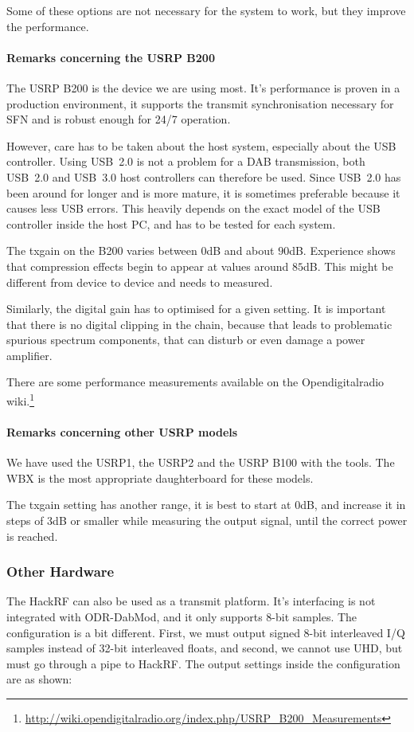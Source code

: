 Some of these options are not necessary for the system to work, but they
improve the performance.

\paragraph{Remarks concerning the USRP B200}
The USRP B200 is the device we are using most. It's performance is proven in a
production environment, it supports the transmit synchronisation necessary for
SFN and is robust enough for 24/7 operation.

However, care has to be taken about the host system, especially about the USB
controller. Using USB~2.0 is not a problem for a DAB transmission, both USB~2.0
and USB~3.0 host controllers can therefore be used. Since USB~2.0 has been
around for longer and is more mature, it is sometimes preferable because it
causes less USB errors. This heavily depends on the exact model of the USB
controller inside the host PC, and has to be tested for each system.

The txgain on the B200 varies between $0$dB and about $90$dB. Experience shows
that compression effects begin to appear at values around $85$dB. This might be
different from device to device and needs to measured.

Similarly, the digital gain has to optimised for a given setting. It is
important that there is no digital clipping in the chain, because that leads to
problematic spurious spectrum components, that can disturb or even damage a
power amplifier.

There are some performance measurements available on the Opendigitalradio
wiki.\footnote{\url{http://wiki.opendigitalradio.org/index.php/USRP\_B200\_Measurements}}

\paragraph{Remarks concerning other USRP models}
We have used the USRP1, the USRP2 and the USRP B100 with the tools. The WBX is
the most appropriate daughterboard for these models.

The txgain setting has another range, it is best to start at $0$dB, and increase
it in steps of $3$dB or smaller while measuring the output signal, until the
correct power is reached.

\subsubsection{Other Hardware}
The HackRF can also be used as a transmit platform. It's interfacing is not
integrated with ODR-DabMod, and it only supports 8-bit samples. The
configuration is a bit different. First, we must output signed 8-bit interleaved
I/Q samples instead of 32-bit interleaved floats, and second, we cannot use UHD,
but must go through a pipe to HackRF. The output settings inside the
configuration are as shown:

